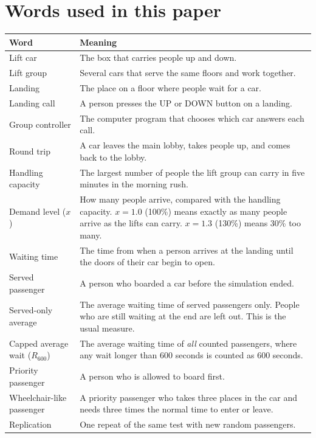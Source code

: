 \section*{Words used in this paper}
\begin{longtable}{@{}p{.27\linewidth}p{.68\linewidth}@{}}
\toprule Word & Meaning\\\midrule\endhead
\bottomrule\endlastfoot
Lift car & The box that carries people up and down.\\
Lift group & Several cars that serve the same floors and work together.\\
Landing & The place on a floor where people wait for a car.\\
Landing call & A person presses the UP or DOWN button on a landing.\\
Group controller & The computer program that chooses which car answers each call.\\
Round trip & A car leaves the main lobby, takes people up, and comes back to the lobby.\\
Handling capacity & The largest number of people the lift group can carry in five minutes in the morning rush.\\
Demand level ($x$) & How many people arrive, compared with the handling capacity. $x=1.0$ (100\%) means exactly as many people arrive as the lifts can carry. $x=1.3$ (130\%) means 30\% too many.\\
Waiting time & The time from when a person arrives at the landing until the doors of their car begin to open.\\
Served passenger & A person who boarded a car before the simulation ended.\\
Served-only average & The average waiting time of served passengers only. People who are still waiting at the end are left out. This is the usual measure.\\
Capped average wait ($R_{600}$) & The average waiting time of \emph{all} counted passengers, where any wait longer than 600 seconds is counted as 600 seconds.\\
Priority passenger & A person who is allowed to board first.\\
Wheelchair-like passenger & A priority passenger who takes three places in the car and needs three times the normal time to enter or leave.\\
Replication & One repeat of the same test with new random passengers.\\
\end{longtable}

